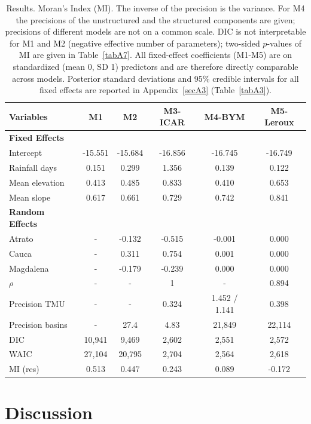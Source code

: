 \documentclass[journal abbreviation, manuscript]{copernicus}
\newcommand{\hl}[1]{#1}
\newcommand{\hlE}[1]{#1}
\begin{document}
\begin{table}[h]
\caption{Results. Moran’s Index (MI). The inverse of the precision is the variance. \hlE{For M4 the precisions of the unstructured and the structured components are given; precisions of different models are not on a common scale. DIC is not interpretable for M1 and M2 (negative effective number of parameters); two-sided $p$-values of MI are given in \mbox{Table~\ref{tabA7}}.} \hl{All fixed-effect coefficients (M1-M5) are on standardized (mean 0, SD 1) predictors and are therefore directly comparable across models. Posterior standard deviations and 95\% credible intervals for all fixed effects are reported in} \hlE{\mbox{Appendix~\ref{secA3}} (\mbox{Table~\ref{tabA3}}).}}\label{tab1}
\begin{tabular}{@{}lccccc@{}}
\toprule
Variables & M1 & M2 & M3-ICAR & M4-BYM & M5-Leroux \\
\midrule
\textbf{Fixed Effects} & & & & & \\
Intercept & -15.551 & -15.684 & -16.856 & -16.745 & -16.749 \\
Rainfall days & 0.151 & 0.299 & 1.356 & 0.139 & 0.122 \\
Mean elevation & 0.413 & 0.485 & 0.833 & 0.410 & 0.653 \\
Mean slope & 0.617 & 0.661 & 0.729 & 0.742 & 0.841 \\
\textbf{Random Effects} & & & & & \\
Atrato & - & -0.132 & -0.515 & -0.001 & 0.000 \\
Cauca & - & 0.311 & 0.754 & 0.001 & 0.000 \\
Magdalena & - & -0.179 & -0.239 & 0.000 & 0.000 \\
$\rho$ & - & - & 1 & - & 0.894 \\
Precision TMU & - & - & 0.324 & 1.452 / 1.141 & 0.398 \\
Precision basins & - & 27.4 & 4.83 & 21,849 & 22,114 \\
\midrule
DIC & 10,941 & 9,469 & 2,602 & 2,551 & 2,572 \\
WAIC & 27,104 & 20,795 & 2,704 & 2,564 & 2,618 \\
MI (res) & 0.513 & 0.447 & 0.243 & 0.089 & -0.172 \\
\bottomrule
\end{tabular}
\end{table}


\section{Discussion}\label{sec5}
\end{document}
